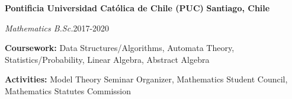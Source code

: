 \documentclass[../main.tex]{subfiles}
\begin{document}
    \textbf{Pontificia Universidad Católica de Chile (PUC)} \hfill \textbf{Santiago, Chile}\par
    \textit{Mathematics B.Sc.}\hfill 2017-2020\par
    \textbf{Coursework:} Data Structures/Algorithms, Automata Theory, Statistics/Probability, Linear Algebra, Abstract Algebra\par
    \textbf{Activities:} Model Theory Seminar Organizer, Mathematics Student Council, Mathematics Statutes Commission 
\end{document}
